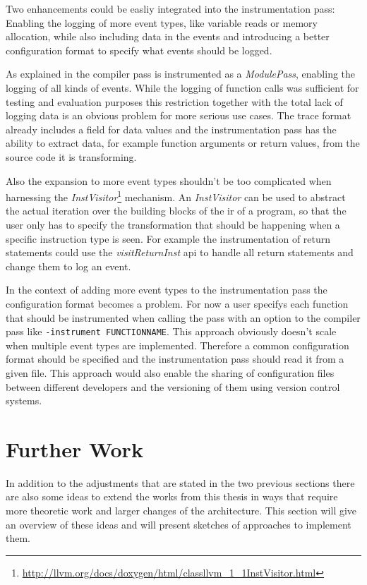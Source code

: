 Two enhancements could be easliy integrated into the instrumentation pass:
Enabling the logging of more event types, like variable reads or memory allocation, while also including data in the events and introducing a better configuration format to specify what events should be logged.

As explained in  the compiler pass is instrumented as a \emph{ModulePass}, enabling the logging of all kinds of events.
While the logging of function calls was sufficient for testing and evaluation purposes this restriction together with the total lack of logging data is an obvious problem for more serious use cases.
The trace format already includes a field for data values and the instrumentation pass has the ability to extract data, for example function arguments or return values, from the source code it is transforming.

Also the expansion to more event types shouldn't be too complicated when harnessing the \emph{InstVisitor}\footnote{\url{http://llvm.org/docs/doxygen/html/classllvm_1_1InstVisitor.html}} mechanism.
An \emph{InstVisitor} can be used to abstract the actual iteration over the building blocks of the \gls{ir} of a program, so that the user only has to specify the transformation that should be happening when a specific instruction type is seen.
For example the instrumentation of return statements could use the \emph{visitReturnInst} \gls{api} to handle all return statements and change them to log an event.

In the context of adding more event types to the instrumentation pass the configuration format becomes a problem.
For now a user specifys each function that should be instrumented when calling the pass with an option to the compiler pass like \lstinline{-instrument FUNCTIONNAME}.
This approach obviously doesn't scale when multiple event types are implemented.
Therefore a common configuration format should be specified and the instrumentation pass should read it from a given file.
This approach would also enable the sharing of configuration files between different developers and the versioning of them using version control systems.

\section{Further Work}
\label{sec:conclusion:further_work}

In addition to the adjustments that are stated in the two previous sections there are also some ideas to extend the works from this thesis in ways that require more theoretic work and larger changes of the architecture.
This section will give an overview of these ideas and will present sketches of approaches to implement them.

